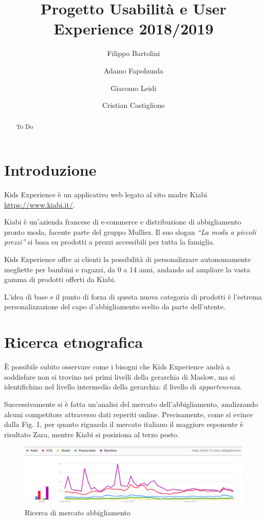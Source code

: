 \documentclass[12pt,italian,]{report}
\title{Progetto Usabilità e User Experience 2018/2019}
\author{Filippo Bartolini \and Adamo Fapohunda \and Giacomo Leidi \and Cristian Castiglione}
\date{}
\begin{document}
\maketitle
\begin{abstract}
To Do
\end{abstract}

{
\setcounter{tocdepth}{2}
\tableofcontents
}
\hypertarget{introduzione}{%
\chapter{Introduzione}\label{introduzione}}

Kids Experience è un applicativo web legato al sito madre Kiabi
\url{https://www.kiabi.it/}.

Kiabi è un'azienda francese di e-commerce e distribuzione di
abbigliamento pronto moda, facente parte del gruppo Mulliez. Il suo
slogan \emph{``La moda a piccoli prezzi''} si basa su prodotti a prezzi
accessibili per tutta la famiglia.

Kids Experience offre ai clienti la possibilità di personalizzare
autonomamente megliette per bambini e ragazzi, da 0 a 14 anni, andando
ad ampliare la vasta gamma di prodotti offerti da Kiabi.

L'idea di base e il punto di forza di questa nuova categoria di prodotti
è l'estrema personalizzazione del capo d'abbigliamento scelto da parte
dell'utente.

\hypertarget{ricerca-etnografica}{%
\chapter{Ricerca etnografica}\label{ricerca-etnografica}}

È possibile subito osservare come i bisogni che Kids Experience andrà a
soddisfare non si trovino nei primi livelli della gerarchia di Maslow,
ma si identifichino nel livello intermedio della gerarchia: il livello
di \emph{appartenenza}.

Successivamente si è fatta un'analisi del mercato dell'abbigliamento,
analizzando alcuni competitors attraverso dati reperiti online.
Precisamente, come si evince dalla Fig. 1, per quanto riguarda il
mercato italiano il maggiore esponente è risultato Zara, mentre Kiabi si
posiziona al terzo posto.

\begin{figure}[h]
\centering
\includegraphics{img/abbigliamento_generico.png}
\caption{Ricerca di mercato abbigliamento}
\end{figure}
\end{document}
